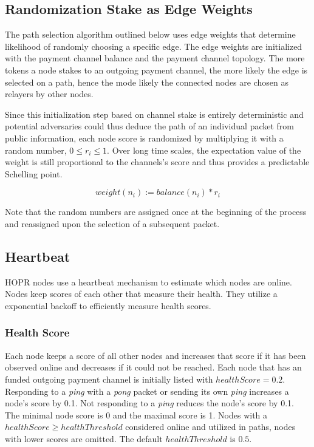 \subsection{Randomization Stake as Edge Weights}
The path selection algorithm outlined below uses edge weights that determine likelihood of randomly choosing a specific edge. The edge weights are initialized with the payment channel balance and the payment channel topology. The more tokens a node stakes to an outgoing payment channel, the more likely the edge is selected on a path, hence the mode likely the connected nodes are chosen as relayers by other nodes.

Since this initialization step based on channel stake is entirely deterministic and potential adversaries could thus deduce the path of an individual packet from public information, each node score is randomized by multiplying it with a random number, $0 \le r_i \le 1$. Over long time scales, the expectation value of the weight is still proportional to the channels's score and thus provides a predictable Schelling point.

$$ weight(n_i) := balance(n_i) * r_i$$

Note that the random numbers are assigned once at the beginning of the process and reassigned upon the selection of a subsequent packet.


\subsection{Heartbeat}
HOPR nodes use a heartbeat mechanism to estimate which nodes are online. Nodes keep scores of each other that measure their health. They utilize a exponential backoff to efficiently measure health scores.

\subsubsection{Health Score}
Each node keeps a score of all other nodes and increases that score if it has been observed online and decreases if it could not be reached. Each node that has an funded outgoing payment channel is initially listed with $healthScore = 0.2$. Responding to a \textit{ping} with a \textit{pong} packet or sending its own \textit{ping} increases a node's score by 0.1. Not responding to a \textit{ping} reduces the node's score by 0.1. The minimal node score is 0 and the maximal score is 1. Nodes with a $healthScore \ge healthThreshold$ considered online and utilized in paths, nodes with lower scores are omitted. The default $healthThreshold$ is $0.5$.

